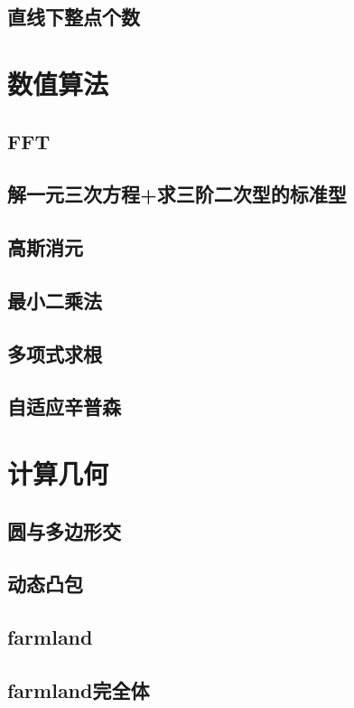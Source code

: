\documentclass[a4paper,10pt]{book}
\begin{document}
	\section{直线下整点个数}
		
	
\chapter{数值算法}
	\section{FFT}
			
	\section{解一元三次方程+求三阶二次型的标准型}
		
	\section{高斯消元}
		
	\section{最小二乘法}
		
	\section{多项式求根}
		
	\section{自适应辛普森}
	 	
\chapter{计算几何}
	\section{圆与多边形交}
		
	\section{动态凸包}
		
	\section{farmland}
		
	\section{farmland完全体}
		
\end{document}
